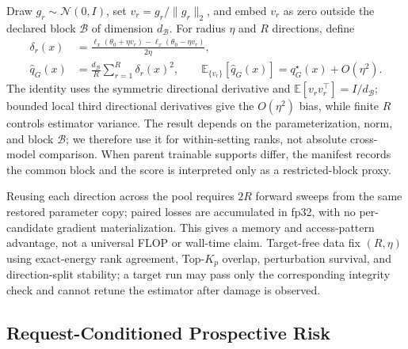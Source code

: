 Draw $g_r\sim\mathcal N(0,I)$, set $v_r=g_r/\|g_r\|_2$, and embed $v_r$ as
zero outside the declared block $\mathcal B$ of dimension $d_{\mathcal B}$.
For radius $\eta$ and $R$ directions, define
\begin{equation}
\begin{aligned}
  \delta_r(x)
  &=
  \frac{\ell_x(\theta_0+\eta v_r)-\ell_x(\theta_0-\eta v_r)}
       {2\eta},\\
  \widehat q_G(x)
  &=
  \frac{d_{\mathcal B}}{R}\sum_{r=1}^{R}\delta_r(x)^2,
  \qquad
  \mathbb E_{\{v_r\}}[\widehat q_G(x)]
  =q_G^\star(x)+O(\eta^2).
\end{aligned}
\label{eq:loss-shake-identity}
\end{equation}
The identity uses the symmetric directional derivative and
$\mathbb E[v_rv_r^\top]=I/d_{\mathcal B}$; bounded local third directional
derivatives give the $O(\eta^2)$ bias, while finite $R$ controls estimator
variance. The result depends on the parameterization, norm, and block
$\mathcal B$; we therefore use it for within-setting ranks, not absolute
cross-model comparison. When parent trainable supports differ, the manifest
records the common block and the score is interpreted only as a
restricted-block proxy.

Reusing each direction across the pool requires $2R$ forward sweeps from the
same restored parameter copy; paired losses are accumulated in fp32, with no
per-candidate gradient materialization. This gives a memory and access-pattern
advantage, not a universal FLOP or wall-time claim. Target-free data fix
$(R,\eta)$ using exact-energy rank agreement,
Top-$K_p$ overlap, perturbation survival, and direction-split stability; a
target run may pass only the corresponding integrity check and cannot retune
the estimator after damage is observed.

\subsection{Request-Conditioned Prospective Risk}
\label{sec:method-representation}
\label{sec:method-mixture}
\label{sec:method-channels}


